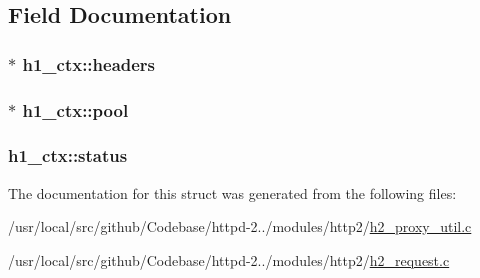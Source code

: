 \subsection{Field Documentation}
\subsubsection[{\texorpdfstring{headers}{headers}}]{ $\ast$ h1\+\_\+ctx\+::headers}\hypertarget{structh1__ctx_a7459d23a81c2e571171767f2ead334eb}{}\label{structh1__ctx_a7459d23a81c2e571171767f2ead334eb}
\subsubsection[{\texorpdfstring{pool}{pool}}]{ $\ast$ h1\+\_\+ctx\+::pool}\hypertarget{structh1__ctx_a0d6999735f5c6fe98f9f4222566f9ad6}{}\label{structh1__ctx_a0d6999735f5c6fe98f9f4222566f9ad6}
\subsubsection[{\texorpdfstring{status}{status}}]{ h1\+\_\+ctx\+::status}\hypertarget{structh1__ctx_a031d6eaa3944eee95c6a01614dfc0b4b}{}\label{structh1__ctx_a031d6eaa3944eee95c6a01614dfc0b4b}


The documentation for this struct was generated from the following files\+:\begin{DoxyCompactItemize}
\item 
/usr/local/src/github/\+Codebase/httpd-\/2../modules/http2/\hyperlink{h2__proxy__util_8c}{h2\+\_\+proxy\+\_\+util.\+c}\item 
/usr/local/src/github/\+Codebase/httpd-\/2../modules/http2/\hyperlink{h2__request_8c}{h2\+\_\+request.\+c}\end{DoxyCompactItemize}
